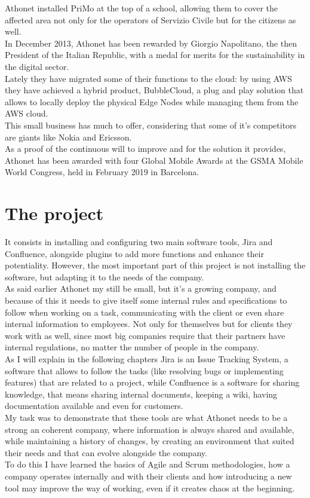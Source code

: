 	Athonet installed PriMo at the top of a school, allowing them to cover the affected area not only for the operators of Servizio Civile but for the citizens as well.\\
	In December 2013, Athonet has been rewarded by Giorgio Napolitano, the then President of the Italian Republic, with a medal for merits for the sustainability in the digital sector.\\
	Lately they have migrated some of their functions to the cloud: by using AWS they have achieved a hybrid product, BubbleCloud, a plug and play solution that allows to locally deploy the physical Edge Nodes while managing them from the AWS cloud.\\
	This small business has much to offer, considering that some of it's competitors are giants like Nokia and Ericsson.\\
	As a proof of the continuous will to improve and for the solution it provides, Athonet has been awarded with four Global Mobile Awards at the GSMA Mobile World Congress, held in February 2019 in Barcelona.

\section{The project}
	It consists in installing and configuring two main software tools, Jira and Confluence, alongside plugins to add more functions and enhance their potentiality.
	However, the most important part of this project is not installing the software, but adapting it to the needs of the company.\\
	As said earlier Athonet my still be small, but it's a growing company, and because of this it needs to give itself some internal rules and specifications to follow when working on a task, communicating with the client or even share internal information to employees.
	Not only for themselves but for clients they work with as well, since most big companies require that their partners have internal regulations, no matter the number of people in the company.\\
	As I will explain in the following chapters Jira is an Issue Tracking System, a software that allows to follow the tasks (like resolving bugs or implementing features) that are related to a project, while Confluence is a software for sharing knowledge, that means sharing internal documents, keeping a wiki, having documentation available and even for customers.\\
	My task was to demonstrate that these tools are what Athonet needs to be a strong an coherent company, where information is always shared and available, while maintaining a history of changes, by creating an environment that suited their needs and that can evolve alongside the company.\\
	To do this I have learned the basics of Agile and Scrum methodologies, how a company operates internally and with their clients and how introducing a new tool may improve the way of working, even if it creates chaos at the beginning.

